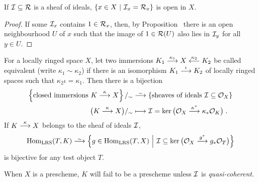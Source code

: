 \documentclass[a4paper,parskip=half,numbers=enddot, DIV=12]{scrreprt}
\begin{document}
\begin{cor}
    If $\mathcal{I}\subseteq \mathcal{R}$ is a sheaf of ideals, $\left\{x\in X\ \middle|\  \mathcal{I}_x=\mathcal{R}_x\right\}$ is open in $X$.
\end{cor}
\begin{proof}
	If some $\mathcal{I}_x$ contains $1\in \mathcal{R}_x$, then, by Proposition~ there is an open neighbourhood $U$ of $x$ such that the image of $1\in\mathcal{R}(U)$ also lies in $\mathcal{I}_y$ for all $y\in U$.
\end{proof}
\begin{prop}
    For a locally ringed space $X$, let two immersions $K_1\morphism[\kappa_1] X\lmorphism[\kappa_2] K_2$ be called equivalent (write $\kappa_1\sim\kappa_2$) if there is an isomorphism $K_1\morphism[\iota] K_2$ of locally ringed spaces such that $\kappa_2\iota = \kappa_1$. Then there is a bijection 
    \begin{align*}
	    \left\{\text{closed immersions }K\morphism[\kappa]X\right\}/_\sim&\isomorphism\left\{\text{sheaves of ideals }\Ii\subseteq \Oo_X\right\}\\
        \big(K\morphism[\kappa]X\big)/_\sim &\longmapsto \Ii = \ker\big(\Oo_X\morphism[\kappa^*]\kappa_* \Oo_K\big)\;.
    \end{align*}
    If $K\morphism[\kappa] X$ belongs to the sheaf of ideals $\mathcal{I}$,
    \begin{align*}
        \Hom_{\cat{LRS}}(T,K) \isomorphism\left\{ g\in \Hom_{\cat{LRS}}(T,X) \st \Ii\subseteq \ker\big(\Oo_X \morphism[g^*]g_*\Oo_T\big)\right\}
    \end{align*}
    is bijective for any test object $T$.
\end{prop}
\begin{rem*}
    When $X$ is a prescheme, $K$ will fail to be a prescheme unless $\mathcal{I}$ is \emph{quasi-coherent}.
\end{rem*}
\end{document}
